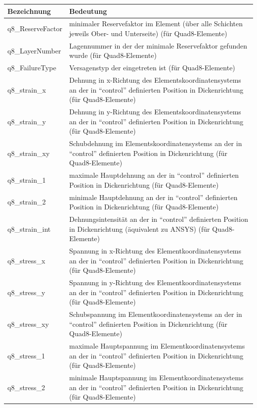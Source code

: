\documentclass[11pt,titlepage,listof=totoc,bibliography=totoc,twoside]{scrreprt}
\begin{document}
{{\begin{tabularx}{\textwidth}{lX}
\toprule
Bezeichnung		& Bedeutung	\\
\midrule
q8\_ReserveFactor	& minimaler Reservefaktor im Element (über alle Schichten jeweils Ober- und Unterseite) (für Quad8-Elemente) \\
q8\_LayerNumber		& Lagennummer in der der minimale Reservefaktor gefunden wurde (für Quad8-Elemente) \\
q8\_FailureType		& Versagenstyp der eingetreten ist (für Quad8-Elemente) \\
q8\_strain\_x		& Dehnung in x-Richtung des Elementskoordinatensystems an der in ``control'' definierten Position in Dickenrichtung (für Quad8-Elemente) \\
q8\_strain\_y		& Dehnung in y-Richtung des Elementskoordinatensystems an der in ``control'' definierten Position in Dickenrichtung (für Quad8-Elemente) \\
q8\_strain\_xy		& Schubdehnung im Elementskoordinatensystems an der in ``control'' definierten Position in Dickenrichtung (für Quad8-Elemente) \\
q8\_strain\_1		& maximale Hauptdehnung an der in ``control'' definierten Position in Dickenrichtung (für Quad8-Elemente) \\
q8\_strain\_2		& minimale Hauptdehnung an der in ``control'' definierten Position in Dickenrichtung (für Quad8-Elemente) \\
q8\_strain\_int		& Dehnungsintensität an der in ``control'' definierten Position in Dickenrichtung (äquivalent zu ANSYS) (für Quad8-Elemente) \\
q8\_stress\_x		& Spannung in x-Richtung des Elementkoordinatensystems an der in ``control'' definierten Position in Dickenrichtung (für Quad8-Elemente) \\
q8\_stress\_y		& Spannung in y-Richtung des Elementkoordinatensystems an der in ``control'' definierten Position in Dickenrichtung (für Quad8-Elemente) \\
q8\_stress\_xy		& Schubspannung im Elementkoordinatensystems an der in ``control'' definierten Position in Dickenrichtung (für Quad8-Elemente) \\
q8\_stress\_1		& maximale Hauptspannung im Elementkoordinatensystems an der in ``control'' definierten Position in Dickenrichtung (für Quad8-Elemente) \\
q8\_stress\_2		& minimale Hauptspannung im Elementkoordinatensystems an der in ``control'' definierten Position in Dickenrichtung (für Quad8-Elemente) \\

\end{tabularx}}}
\end{document}
